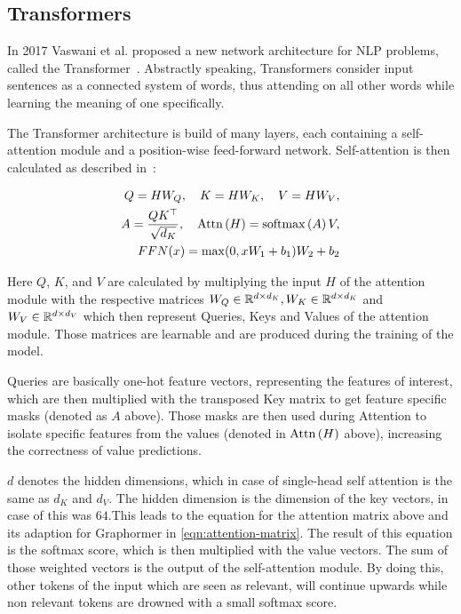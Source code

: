\subsection{Transformers}
In 2017 Vaswani et al. proposed a new network architecture for NLP problems, called the Transformer~\cite{vaswani2017attention}. Abstractly speaking, Transformers consider input sentences as a connected system of words, thus attending on all other words while learning the meaning of one specifically.

The Transformer architecture is build of many layers, each containing a self-attention module and a position-wise feed-forward network. Self-attention is then calculated as described in~\cite{2021graphormer}:

\begin{align}
    Q = HW_Q,\quad K = HW_K,\quad V = HW_V,\label{eqn:attention-alpha} \\
    A = \frac{QK^\top}{\sqrt{d_K}}, \quad \mathrm{Attn}\left(H\right) = \mathrm{softmax}\left(A\right)V,     \\
    FFN(x) = \max(0,xW_1 + b_1)W_2 + b_2
    \label{eqn:attention-alpha2}
\end{align}

Here $Q$, $K$, and $V$ are calculated by multiplying the input $H$ of the attention module with the respective matrices $W_Q\in\mathbb{R}^{d\times d_K}, W_K\in\mathbb{R}^{d\times d_K}$ and $ W_V\in\mathbb{R}^{d\times d_V}$ which then represent Queries, Keys and Values of the attention module. Those matrices are learnable and are produced during the training of the model.

Queries are basically one-hot feature vectors, representing the features of interest, which are then multiplied with the transposed Key matrix to get feature specific masks (denoted as $A$ above). Those masks are then used during Attention to isolate specific features from the values (denoted in $\mathrm{Attn}\left(H\right)$ above), increasing the correctness of value predictions.

$d$ denotes the hidden dimensions, which in case of single-head self attention is the same as $d_K$ and $d_V$. The hidden dimension is the dimension of the key vectors, in case of \cite{vaswani2017attention} this was $64$.This leads to the equation for the attention matrix above and its adaption for Graphormer in \autoref{eqn:attention-matrix}. The result of this equation is the softmax score, which is then multiplied with the value vectors. The sum of those weighted vectors is the output of the self-attention module. By doing this, other tokens of the input which are seen as relevant, will continue upwards while non relevant tokens are drowned with a small softmax score.

